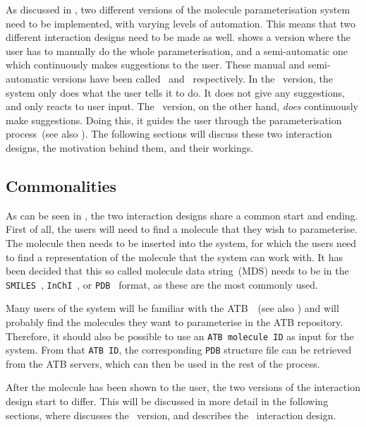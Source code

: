 As discussed in , two different versions of the molecule parameterisation system need to be implemented, with varying levels of automation. This means that two different interaction designs need to be made as well.  shows a version where the user has to manually do the whole parameterisation, and a semi-automatic one which continuously makes suggestions to the user. These manual and semi-automatic versions have been called \IDa\ and \IDb\ respectively. In the \IDa\ version, the system only does what the user tells it to do. It does not give any suggestions, and only reacts to user input. The \IDb\ version, on the other hand, \emph{does} continuously make suggestions. Doing this, it guides the user through the parameterisation process~(see also ). The following sections will discuss these two interaction designs, the motivation behind them, and their workings.


\subsection{Commonalities}
As can be seen in , the two interaction designs share a common start and ending. First of all, the users will need to find a molecule that they wish to parameterise. The molecule then needs to be inserted into the system, for which the users need to find a representation of the molecule that the system can work with. It has been decided that this so called molecule data string~(MDS) needs to be in the \verb|SMILES|~\cite{daylight1992daylight}, \verb|InChI|~\cite{heller2013inchi}, or \verb|PDB|~\cite{bernstein1977protein} format, as these are the most commonly used.

Many users of the system will be familiar with the ATB~\cite{malde2011automated}~(see also ) and will probably find the molecules they want to parameterise in the ATB repository. Therefore, it should also be possible to use an \verb|ATB molecule ID| as input for the system. From that \verb|ATB ID|, the corresponding \verb|PDB| structure file can be retrieved from the ATB servers, which can then be used in the rest of the process.

After the molecule has been shown to the user, the two versions of the interaction design start to differ. This will be discussed in more detail in the following sections, where  discusses the \IDa\ version, and  describes the \IDb\ interaction design.

